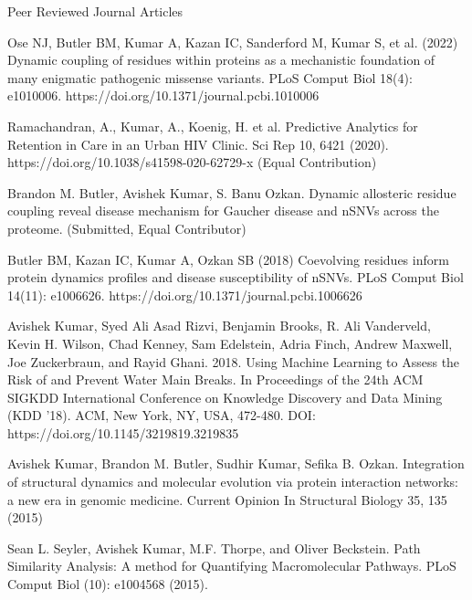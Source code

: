 \begin{cventries}
\cventry
    {}
    {Peer Reviewed Journal Articles}
    {}
    {}
    {
\begin{cvitems}
    \vspace{-1\baselineskip}
    \setlength\itemsep{.5em}
    \item Ose NJ, Butler BM, Kumar A, Kazan IC, Sanderford M, Kumar S, et al. (2022) Dynamic coupling of residues within proteins as a mechanistic foundation of many enigmatic pathogenic missense variants. PLoS Comput Biol 18(4): e1010006. https://doi.org/10.1371/journal.pcbi.1010006
    \item Ramachandran, A., Kumar, A., Koenig, H. et al. Predictive Analytics for Retention in Care in an Urban HIV Clinic. Sci Rep 10, 6421 (2020). https://doi.org/10.1038/s41598-020-62729-x (Equal Contribution)
    \item Brandon M. Butler, Avishek Kumar, S. Banu Ozkan. Dynamic allosteric residue coupling reveal disease mechanism for Gaucher disease and nSNVs across the proteome. (Submitted, Equal Contributor)
    \item Butler BM, Kazan IC, Kumar A, Ozkan SB (2018) Coevolving residues inform protein dynamics profiles and disease susceptibility of nSNVs. PLoS Comput Biol 14(11): e1006626. https://doi.org/10.1371/journal.pcbi.1006626
    \item Avishek Kumar, Syed Ali Asad Rizvi, Benjamin Brooks, R. Ali Vanderveld, Kevin H. Wilson, Chad
Kenney, Sam Edelstein, Adria Finch, Andrew Maxwell, Joe Zuckerbraun, and Rayid Ghani. 2018.
Using Machine Learning to Assess the Risk of and Prevent Water Main Breaks. In Proceedings of the
24th ACM SIGKDD International Conference on Knowledge Discovery and Data Mining (KDD '18).
ACM, New York, NY, USA, 472-480. DOI: https://doi.org/10.1145/3219819.3219835
    \item Avishek Kumar, Brandon M. Butler, Sudhir Kumar, Sefika B. Ozkan. Integration of structural
dynamics and molecular evolution via protein interaction networks: a new era in genomic medicine.
Current Opinion In Structural Biology 35, 135 (2015)
    \item Sean L. Seyler, Avishek Kumar, M.F. Thorpe, and Oliver Beckstein. Path Similarity Analysis: A
method for Quantifying Macromolecular Pathways. PLoS Comput Biol (10): e1004568 (2015).

\end{cvitems}}
\end{cventries}
